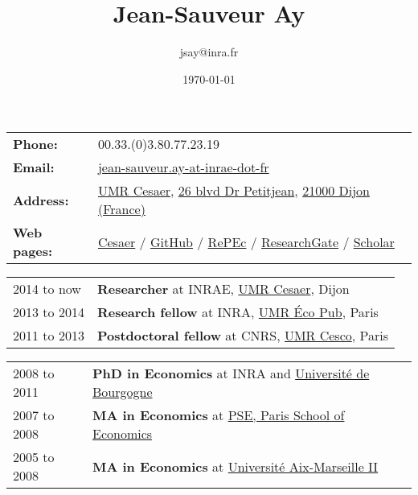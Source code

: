 \documentclass[11pt, a4paper]{./style}
\author{jsay@inra.fr}
\date{\today}
\title{Jean-Sauveur Ay}
\begin{document}
\maketitle


\label{sec:org5d6672d}

\begin{center}
\begin{tabular}{ll}
\textbf{Phone:} & 00.33.(0)3.80.77.23.19\\
\textbf{Email:} & \href{mailto:jean-sauveur.ay@inrae.fr}{jean-sauveur.ay-at-inrae-dot-fr}\\
\textbf{Address:} & \href{https://www2.dijon.inrae.fr/cesaer/en/axis/}{UMR Cesaer}, \href{https://www.google.com/maps/?q\%3D47.3097819,5.0644835}{26 blvd Dr Petitjean}, \href{https://www.google.com/maps/place/21000+Dijon/}{21000 Dijon (France)}\\
\textbf{Web pages:} & \href{https://www2.dijon.inrae.fr/cesaer/membres/jean-sauveur-ay/}{Cesaer} / \href{http://github.com/jsay/}{GitHub} / \href{https://ideas.repec.org/e/pay77.html}{RePEc} / \href{https://www.researchgate.net/profile/Jean\_Sauveur\_Ay}{ResearchGate} / \href{https://scholar.google.fr/citations?user=arEwxlIAAAAJ\&hl=fr}{Scholar}\\
\end{tabular}
\end{center}

\label{sec:orga45019a}

\begin{center}
\begin{tabular}{ll}
2014 to now & \textbf{Researcher} at INRAE, \href{https://www2.dijon.inrae.fr/cesaer/en/axis/}{UMR Cesaer}, Dijon\\
2013 to 2014 & \textbf{Research fellow} at INRA, \href{https://www6.versailles-grignon.inrae.fr/economie\_publique\_eng/}{UMR Éco Pub}, Paris\\
2011 to 2013 & \textbf{Postdoctoral fellow} at CNRS, \href{http://cesco.mnhn.fr/en}{UMR Cesco}, Paris\\
\end{tabular}
\end{center}

\label{sec:org99c51c3}

\begin{center}
\begin{tabular}{ll}
2008 to 2011 & \textbf{PhD in Economics} at INRA and \href{http://en.u-bourgogne.fr/}{Université de Bourgogne}\\
2007 to 2008 & \textbf{MA in Economics} at \href{https://www.parisschoolofeconomics.eu/en/}{PSE, Paris School of Economics}\\
2005 to 2008 & \textbf{MA in Economics} at \href{https://www.amse-aixmarseille.fr/en}{Université Aix-Marseille II}\\
\end{tabular}
\end{center}
\end{document}
